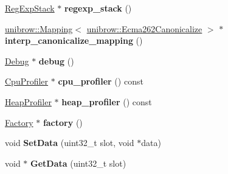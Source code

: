 \begin{DoxyCompactItemize}
\item 
\hyperlink{classv8_1_1internal_1_1_reg_exp_stack}{Reg\+Exp\+Stack} $\ast$ {\bfseries regexp\+\_\+stack} ()\hypertarget{classv8_1_1internal_1_1_isolate_a93ba4595a63e17be7f29ccd1d5231ee7}{}\label{classv8_1_1internal_1_1_isolate_a93ba4595a63e17be7f29ccd1d5231ee7}

\item 
\hyperlink{classunibrow_1_1_mapping}{unibrow\+::\+Mapping}$<$ \hyperlink{structunibrow_1_1_ecma262_canonicalize}{unibrow\+::\+Ecma262\+Canonicalize} $>$ $\ast$ {\bfseries interp\+\_\+canonicalize\+\_\+mapping} ()\hypertarget{classv8_1_1internal_1_1_isolate_ab3d2c09b64fcc90f1320c6b368f9e3f1}{}\label{classv8_1_1internal_1_1_isolate_ab3d2c09b64fcc90f1320c6b368f9e3f1}

\item 
\hyperlink{classv8_1_1internal_1_1_debug}{Debug} $\ast$ {\bfseries debug} ()\hypertarget{classv8_1_1internal_1_1_isolate_a5dd8bb2f8e59eea510c69a2062c5032e}{}\label{classv8_1_1internal_1_1_isolate_a5dd8bb2f8e59eea510c69a2062c5032e}

\item 
\hyperlink{classv8_1_1internal_1_1_cpu_profiler}{Cpu\+Profiler} $\ast$ {\bfseries cpu\+\_\+profiler} () const \hypertarget{classv8_1_1internal_1_1_isolate_ada91c31eaf4c0816b99a2e5207d98989}{}\label{classv8_1_1internal_1_1_isolate_ada91c31eaf4c0816b99a2e5207d98989}

\item 
\hyperlink{classv8_1_1internal_1_1_heap_profiler}{Heap\+Profiler} $\ast$ {\bfseries heap\+\_\+profiler} () const \hypertarget{classv8_1_1internal_1_1_isolate_a75f744e0609fb00cdb95838fe965a4c3}{}\label{classv8_1_1internal_1_1_isolate_a75f744e0609fb00cdb95838fe965a4c3}

\item 
\hyperlink{classv8_1_1internal_1_1_factory}{Factory} $\ast$ {\bfseries factory} ()\hypertarget{classv8_1_1internal_1_1_isolate_af64b78f074da3809c636b9d3dce4d2d7}{}\label{classv8_1_1internal_1_1_isolate_af64b78f074da3809c636b9d3dce4d2d7}

\item 
void {\bfseries Set\+Data} (uint32\+\_\+t slot, void $\ast$data)\hypertarget{classv8_1_1internal_1_1_isolate_aaeb394d75f5a876203b380a110ada080}{}\label{classv8_1_1internal_1_1_isolate_aaeb394d75f5a876203b380a110ada080}

\item 
void $\ast$ {\bfseries Get\+Data} (uint32\+\_\+t slot)\hypertarget{classv8_1_1internal_1_1_isolate_a44144de1109d31f853dd1e8fb305c312}{}\label{classv8_1_1internal_1_1_isolate_a44144de1109d31f853dd1e8fb305c312}


\end{DoxyCompactItemize}
